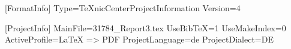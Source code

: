 [FormatInfo]
Type=TeXnicCenterProjectInformation
Version=4

[ProjectInfo]
MainFile=31784_Report3.tex
UseBibTeX=1
UseMakeIndex=0
ActiveProfile=LaTeX => PDF
ProjectLanguage=de
ProjectDialect=DE

